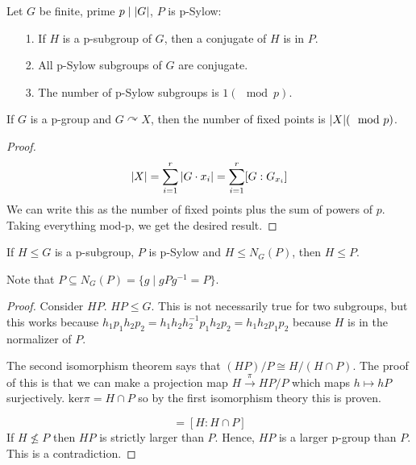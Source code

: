 \documentclass[a4paper,twoside,master.tex]{subfiles}
\begin{document}

\begin{theorem}[Sylow]
    Let $ G $ be finite, prime $ p \mid \abs{G} $, $ P $ is p-Sylow:
    \begin{itemize}
        \item[1.] If $ H $ is a p-subgroup of $ G $, then a conjugate of $ H $ is in $ P $.
        \item[2.] All p-Sylow subgroups of $ G $ are conjugate.
        \item[3.] The number of p-Sylow subgroups is $ 1 (\mod p) $.
    \end{itemize}
\end{theorem}

\begin{lemma}
    If $ G $ is a p-group and $ G\curvearrowright X $, then the number of fixed points is $ \abs{X} (\mod p) $.
\end{lemma}
\begin{proof}
    \begin{equation}
        \abs{X} = \sum_{i=1}^r \abs{G \cdot x_i} = \sum_{i = 1}^r [G:G_{x_i}]
    \end{equation}
    We can write this as the number of fixed points plus the sum of powers of $ p $. Taking everything mod-p, we get the desired result.
\end{proof}

\begin{lemma}
    If $ H \leq G $ is a p-subgroup, $ P $ is p-Sylow and $ H \leq N_G(P) $, then $ H \leq P $.
\end{lemma}

Note that $ P \subseteq N_G(P) = \{g \mid gPg^{-1} = P\} $.

\begin{proof}
    Consider $ HP $. $ HP \leq G $. This is not necessarily true for two subgroups, but this works because $ h_1 p_1 h_2 p_2 = h_1 h_2 h_2^{-1} p_1 h_2 p_2 = h_1 h_2 p_1 p_2 $ because $ H $ is in the normalizer of $ P $.

    The second isomorphism theorem says that $ (HP)/P \cong H/(H \cap P) $. The proof of this is that we can make a projection map $ H \xrightarrow{\pi} HP/P $ which maps $ h\mapsto hP $ surjectively. $ \text{ker} \pi = H \cap P $ so by the first isomorphism theory this is proven.

    \begin{equation}
        [HP:P] = [H:H \cap P]
    \end{equation}
    If $ H \nleq P $ then $ HP $ is strictly larger than $ P $. Hence, $ HP $ is a larger p-group than $ P $. This is a contradiction.
\end{proof}
\end{document}
